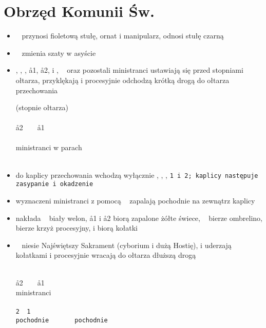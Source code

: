 \section{Obrzęd Komunii Św.}

\begin{itemize}
      \item \zz~ przynosi {\color{violet} fioletową} stułę, ornat i manipularz,
            odnosi stułę czarną
      \item \ii~ zmienia szaty w asyście 
      \item \ii, , , \aa1, \aa2,  i , \oo~ oraz
            pozostali ministranci ustawiają się przed stopniami ołtarza,
            przyklękają i procesyjnie odchodzą krótką drogą do ołtarza
            przechowania

            \begin{center}
                  (stopnie ołtarza) \smallskip\\
                  ~~\ii~~ \smallskip\\
                  \aa2~~~~\aa1 \smallskip\\
                  ~~~~ \smallskip\\
                  ministranci w parach \smallskip\\
                  \oo \smallskip\\
                  \downarrow
            \end{center}

      \item do kaplicy przechowania wchodzą wyłącznie \ii, , , \tt1 i
            \tt2; kaplicy następuje zasypanie i okadzenie
      \item wyznaczeni ministranci z pomocą \zz~ zapalają pochodnie na zewnątrz
            kaplicy
      \item {} nakłada \ii~ biały welon, \aa1 i \aa2 biorą zapalone
                  {\color{orange}żółte} świece, \oo~ bierze ombrelino, 
            bierze krzyż procesyjny,  i  biorą kołatki
      \item \ii~ niesie Najświętszy Sakrament (cyborium i dużą Hostię),  i
             uderzają kołatkami i procesyjnie wracają do ołtarza dłuższą
            drogą

            \begin{center}
                  \uparrow \smallskip\\
                  \aa2~~~~\aa1 \smallskip\\
                  ministranci \smallskip\\
                  ~~ \smallskip\\
                  \tt2~~\tt1 \smallskip\\
                  pochodnie~~~~\ii~~ pochodnie \smallskip\\
                  \oo
            \end{center}


\end{itemize}
